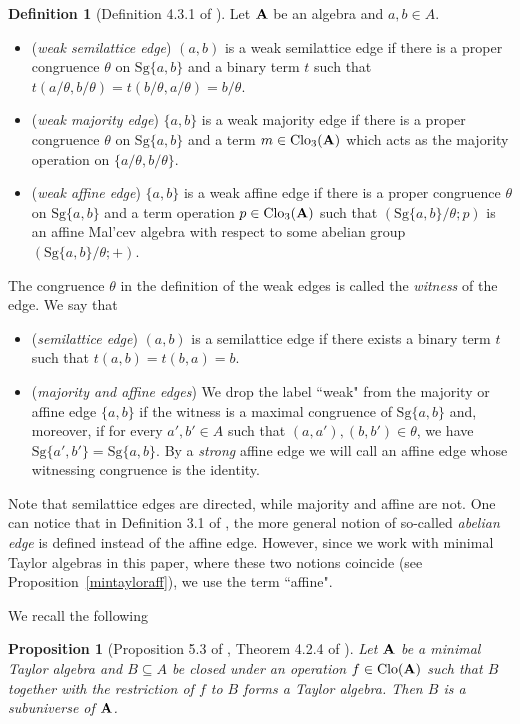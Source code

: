 \documentclass[11pt]{amsart}
\newcommand{\m}[1]{\mathbf{\uppercase{#1}}}
\newtheorem{prp}[thm]{Proposition}
\theoremstyle{definition}
\newtheorem{dfn}[thm]{Definition}
\theoremstyle{remark}
\theoremstyle{plain}
\begin{document}
\begin{dfn}[Definition 4.3.1 of \cite{Zebnotes}]
Let $\m A$ be an algebra and $a,b\in A$.
\begin{itemize}
\item ({\em weak semilattice edge}) $(a, b)$ is a weak semilattice edge if there is a proper congruence $\theta$ on $\mathrm{Sg}\{a,b\}$ and a binary term $t$ such that $t(a/\theta, b/\theta) = t(b/\theta, a/\theta) = b/\theta$.
\item ({\em weak majority edge}) $\{a,b\}$ is a weak majority edge if there is a proper congruence $\theta$ on $\mathrm{Sg}\{a,b\}$ and a term $m\in \mathrm{Clo}_3({\m A})$ which acts as the majority operation on $\{a/\theta, b/\theta \}$.
\item ({\em weak affine edge}) $\{a,b\}$ is a weak affine edge if there is a proper congruence $\theta$ on $\mathrm{Sg}\{a,b\}$ and a term operation $p\in \mathrm{Clo}_3({\m A})$ such that $(\mathrm{Sg}\{a,b\}/\theta;p)$ is an affine Mal'cev algebra with respect to some abelian group $(\mathrm{Sg}\{a,b\}/\theta;+)$.
\end{itemize}
The congruence $\theta$ in the definition of the weak edges is called the {\em witness} of the edge. We say that
\begin{itemize}
\item ({\em semilattice edge}) $(a, b)$ is a semilattice edge if there exists a binary term $t$ such that $t(a, b) = t(b, a) = b$.
\item ({\em majority and affine edges}) We drop the label ``weak" from the majority or affine edge $\{a,b\}$ if the witness is a maximal congruence of $\mathrm{Sg}\{a,b\}$ and, moreover, if for every $a',b' \in A$ such that $(a,a'), (b,b')\in \theta$, we have $\mathrm{Sg}\{a',b'\}=\mathrm{Sg}\{a,b\}$. By a {\em strong} affine edge we will call an affine edge whose witnessing congruence is the identity.
\end{itemize}
\end{dfn}
Note that semilattice edges are directed, while majority and affine are not. One can notice that in Definition 3.1 of \cite{dreamteam}, the more general notion of so-called \emph{abelian edge} is defined instead of the affine edge. However, since we work with minimal Taylor algebras in this paper, where these two notions coincide (see Proposition~\ref{mintayloraff}), we use the term ``affine". 

We recall the following 

\begin{prp}[Proposition 5.3 of \cite{dreamteam}, Theorem 4.2.4 of \cite{Zebnotes}]\label{subuniverse}
Let $\m A$ be a minimal Taylor algebra and $B\subseteq A$ be closed under an operation $f\in \mathrm{Clo}({\m A})$ such that $B$ together with the restriction of $f$ to $B$ forms a Taylor algebra. Then $B$ is a subuniverse of ${\m A}$.
\end{prp}
\end{document}
